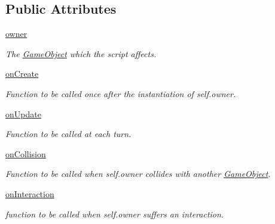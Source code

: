 \subsection*{\-Public \-Attributes}
\begin{DoxyCompactItemize}
\item 
\hypertarget{classScript_1_1Script_a5953fa4e7305e0af72c5853a76c29698}{\hyperlink{classScript_1_1Script_a5953fa4e7305e0af72c5853a76c29698}{owner}}\label{classScript_1_1Script_a5953fa4e7305e0af72c5853a76c29698}

\begin{DoxyCompactList}\small\item\em \-The \hyperlink{namespaceGameObject}{\-Game\-Object} which the script affects. \end{DoxyCompactList}\item 
\hypertarget{classScript_1_1Script_a402bc01b65d4fbdcda8c04188df3b33e}{\hyperlink{classScript_1_1Script_a402bc01b65d4fbdcda8c04188df3b33e}{on\-Create}}\label{classScript_1_1Script_a402bc01b65d4fbdcda8c04188df3b33e}

\begin{DoxyCompactList}\small\item\em \-Function to be called once after the instantiation of self.\-owner. \end{DoxyCompactList}\item 
\hypertarget{classScript_1_1Script_a5011704e68cf5edaeb37f1640edacd65}{\hyperlink{classScript_1_1Script_a5011704e68cf5edaeb37f1640edacd65}{on\-Update}}\label{classScript_1_1Script_a5011704e68cf5edaeb37f1640edacd65}

\begin{DoxyCompactList}\small\item\em \-Function to be called at each turn. \end{DoxyCompactList}\item 
\hypertarget{classScript_1_1Script_aeb1b75f0e269eb9719dd775b96258d5b}{\hyperlink{classScript_1_1Script_aeb1b75f0e269eb9719dd775b96258d5b}{on\-Collision}}\label{classScript_1_1Script_aeb1b75f0e269eb9719dd775b96258d5b}

\begin{DoxyCompactList}\small\item\em \-Function to be called when self.\-owner collides with another \hyperlink{namespaceGameObject}{\-Game\-Object}. \end{DoxyCompactList}\item 
\hyperlink{classScript_1_1Script_a2005d9e06798af0c2c8e6fa2ca976fb6}{on\-Interaction}
\begin{DoxyCompactList}\small\item\em function to be called when self.\-owner suffers an interaction. \end{DoxyCompactList}\end{DoxyCompactItemize}


